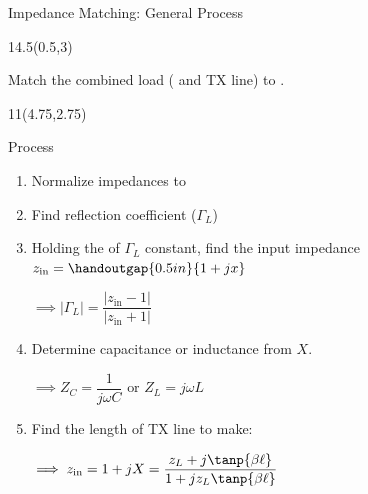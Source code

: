 \begin{frame}{Impedance Matching: General Process}

	\begin{textblock}{14.5}(0.5,3)

	Match the combined load ( and TX line) to .
		
		\vspace{1in}
	\end{textblock}
	
	\begin{textblock}{11}(4.75,2.75)
	\begin{myblock}[0.95]{Process}
	
	\begin{small}
	\begin{enumerate}
	
		\item Normalize impedances to 
		
		\item Find reflection coefficient ($\Gamma_L$)
		
		\item Holding the  of $\Gamma_L$ constant, find the input impedance $z_{\text{in}} = \handoutgap{0.5in}{1 + jx}$ 
		
		$\implies |\Gamma_L | = \dfrac{| z_{\text{in}} - 1 |}{|z_{\text{in}} + 1|}$
		
		\item Determine capacitance or inductance from $X$. 
		
		$\implies Z_C = \dfrac{1}{j\omega C} \text{ or } Z_L = j\omega L$
		
		\item Find the length of TX line to make:
		
		$\implies z_{\text{in}} = 1+jX =  \dfrac{z_L + j\tanp{\beta \ell}}{1+jz_L\tanp{\beta\ell}}$
		

	\end{enumerate}
	\end{small}
	
	\end{myblock}
	\end{textblock}


	
\end{frame}


